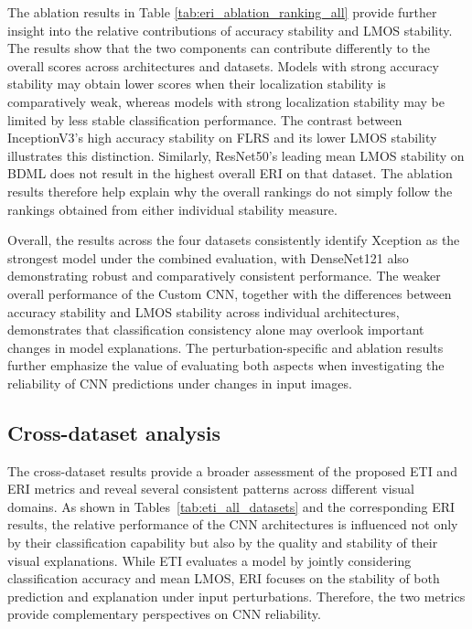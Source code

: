 \documentclass[a4paper,fleqn]{cas-dc}
\begin{document}
The ablation results in Table \ref{tab:eri_ablation_ranking_all} provide further insight into the relative contributions of accuracy stability and LMOS stability. The results show that the two components can contribute differently to the overall scores across architectures and datasets. Models with strong accuracy stability may obtain lower scores when their localization stability is comparatively weak, whereas models with strong localization stability may be limited by less stable classification performance. The contrast between InceptionV3's high accuracy stability on FLRS and its lower LMOS stability illustrates this distinction. Similarly, ResNet50's leading mean LMOS stability on BDML does not result in the highest overall ERI on that dataset. The ablation results therefore help explain why the overall rankings do not simply follow the rankings obtained from either individual stability measure.

Overall, the results across the four datasets consistently identify Xception as the strongest model under the combined evaluation, with DenseNet121 also demonstrating robust and comparatively consistent performance. The weaker overall performance of the Custom CNN, together with the differences between accuracy stability and LMOS stability across individual architectures, demonstrates that classification consistency alone may overlook important changes in model explanations. The perturbation-specific and ablation results further emphasize the value of evaluating both aspects when investigating the reliability of CNN predictions under changes in input images.

\subsection{Cross-dataset analysis}
The cross-dataset results provide a broader assessment of the proposed ETI and ERI metrics and reveal several consistent patterns across different visual domains. As shown in Tables~\ref{tab:eti_all_datasets} and the corresponding ERI results, the relative performance of the CNN architectures is influenced not only by their classification capability but also by the quality and stability of their visual explanations. While ETI evaluates a model by jointly considering classification accuracy and mean LMOS, ERI focuses on the stability of both prediction and explanation under input perturbations. Therefore, the two metrics provide complementary perspectives on CNN reliability.
\end{document}
